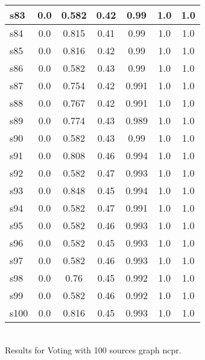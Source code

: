 \documentclass{article}
\begin{document}
\begin{tabular}{|l|c|c|c|c|c|c|}
s83 &0.0 & 0.582 & 0.42 & 0.99 & 1.0 & 1.0\\
\hline
s84 &0.0 & 0.815 & 0.41 & 0.99 & 1.0 & 1.0\\
\hline
s85 &0.0 & 0.816 & 0.42 & 0.99 & 1.0 & 1.0\\
\hline
s86 &0.0 & 0.582 & 0.43 & 0.99 & 1.0 & 1.0\\
\hline
s87 &0.0 & 0.754 & 0.42 & 0.991 & 1.0 & 1.0\\
\hline
s88 &0.0 & 0.767 & 0.42 & 0.991 & 1.0 & 1.0\\
\hline
s89 &0.0 & 0.774 & 0.43 & 0.989 & 1.0 & 1.0\\
\hline
s90 &0.0 & 0.582 & 0.43 & 0.99 & 1.0 & 1.0\\
\hline
s91 &0.0 & 0.808 & 0.46 & 0.994 & 1.0 & 1.0\\
\hline
s92 &0.0 & 0.582 & 0.47 & 0.993 & 1.0 & 1.0\\
\hline
s93 &0.0 & 0.848 & 0.45 & 0.994 & 1.0 & 1.0\\
\hline
s94 &0.0 & 0.582 & 0.47 & 0.991 & 1.0 & 1.0\\
\hline
s95 &0.0 & 0.582 & 0.46 & 0.993 & 1.0 & 1.0\\
\hline
s96 &0.0 & 0.582 & 0.45 & 0.993 & 1.0 & 1.0\\
\hline
s97 &0.0 & 0.582 & 0.46 & 0.993 & 1.0 & 1.0\\
\hline
s98 &0.0 & 0.76 & 0.45 & 0.992 & 1.0 & 1.0\\
\hline
s99 &0.0 & 0.582 & 0.46 & 0.992 & 1.0 & 1.0\\
\hline
s100 &0.0 & 0.816 & 0.45 & 0.993 & 1.0 & 1.0\\
\hline
\end{tabular}\\

\noindent Results for Voting with 100 sources graph ncpr.
\end{document}
